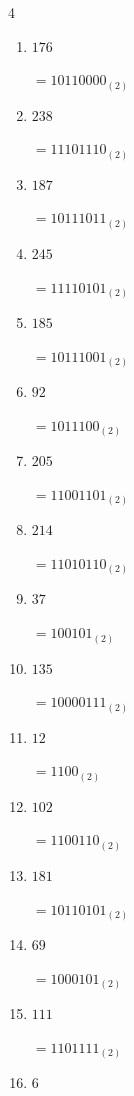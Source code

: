 \begin{multicols}{4}
\begin{enumerate}
        $=10011111_{(2)}$

  \item $176$

        $=10110000_{(2)}$

  \item $238$

        $=11101110_{(2)}$

  \item $187$

        $=10111011_{(2)}$

  \item $245$

        $=11110101_{(2)}$

  \item $185$

        $=10111001_{(2)}$

  \item $92$

        $=1011100_{(2)}$

  \item $205$

        $=11001101_{(2)}$

  \item $214$

        $=11010110_{(2)}$

  \item $37$

        $=100101_{(2)}$

  \item $135$

        $=10000111_{(2)}$

  \item $12$

        $=1100_{(2)}$

\columnbreak %

  \item $102$

        $=1100110_{(2)}$

  \item $181$

        $=10110101_{(2)}$

  \item $69$

        $=1000101_{(2)}$

  \item $111$

        $=1101111_{(2)}$

  \item $6$


\end{enumerate}
\end{multicols}
